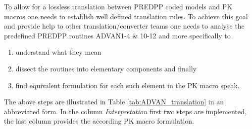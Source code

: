 To allow for a lossless translation between PREDPP coded models and PK macros one needs
to establish well defined translation rules. To achieve this goal and provide help to other 
translation/converter teams one needs to analyse the predefined PREDPP routines ADVAN1-4 \& 10-12
and more specifically to
\begin{enumerate}
\item
understand what they mean
\item
dissect the routines into elementary components and finally 
\item
find equivalent formulation for each such element in the PK macro speak.
\end{enumerate}
The above steps are illustrated in Table \ref{tab:ADVAN_translation} in an abbreviated form. 
In the column \emph{Interpretation} first two steps are implemented, 
the last column provides the according PK macro formulation.

